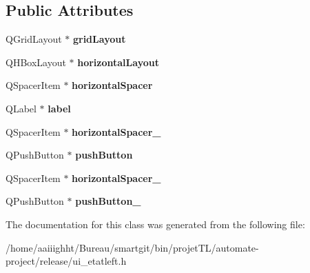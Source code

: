 \subsection*{Public Attributes}
\begin{DoxyCompactItemize}
\item 
\hypertarget{class_ui__etat_left_a274c9cd2b7f92638d78caf593154db32}{Q\-Grid\-Layout $\ast$ {\bfseries grid\-Layout}}\label{class_ui__etat_left_a274c9cd2b7f92638d78caf593154db32}

\item 
\hypertarget{class_ui__etat_left_adf0d56b2cf4c98e71862ab4e70b54745}{Q\-H\-Box\-Layout $\ast$ {\bfseries horizontal\-Layout}}\label{class_ui__etat_left_adf0d56b2cf4c98e71862ab4e70b54745}

\item 
\hypertarget{class_ui__etat_left_a0cabeb67430491c335b0a1638caa5231}{Q\-Spacer\-Item $\ast$ {\bfseries horizontal\-Spacer}}\label{class_ui__etat_left_a0cabeb67430491c335b0a1638caa5231}

\item 
\hypertarget{class_ui__etat_left_a596dbac3f6ee43e6e5ef5f469d9fd227}{Q\-Label $\ast$ {\bfseries label}}\label{class_ui__etat_left_a596dbac3f6ee43e6e5ef5f469d9fd227}

\item 
\hypertarget{class_ui__etat_left_a7122a5b8c6c69c99d33b250c507dfc50}{Q\-Spacer\-Item $\ast$ {\bfseries horizontal\-Spacer\-\_}}\label{class_ui__etat_left_a7122a5b8c6c69c99d33b250c507dfc50}

\item 
\hypertarget{class_ui__etat_left_a7dc041bae70f473df0a8d2e564904191}{Q\-Push\-Button $\ast$ {\bfseries push\-Button}}\label{class_ui__etat_left_a7dc041bae70f473df0a8d2e564904191}

\item 
\hypertarget{class_ui__etat_left_a4c0c0bb1c5e29099a1154761ccb107e8}{Q\-Spacer\-Item $\ast$ {\bfseries horizontal\-Spacer\-\_}}\label{class_ui__etat_left_a4c0c0bb1c5e29099a1154761ccb107e8}

\item 
\hypertarget{class_ui__etat_left_ab37a1ceedd6f15876f18720c51a3df43}{Q\-Push\-Button $\ast$ {\bfseries push\-Button\-\_}}\label{class_ui__etat_left_ab37a1ceedd6f15876f18720c51a3df43}

\end{DoxyCompactItemize}


The documentation for this class was generated from the following file\-:\begin{DoxyCompactItemize}
\item 
/home/aaiiighht/\-Bureau/smartgit/bin/projet\-T\-L/automate-\/project/release/ui\-\_\-etatleft.\-h\end{DoxyCompactItemize}
